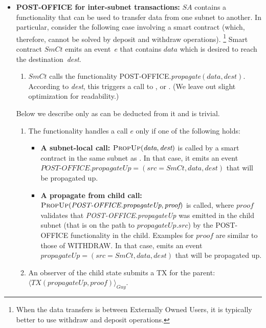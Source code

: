\begin{itemize}
    \item \textbf{POST-OFFICE for inter-subnet transactions:} $SA$ contains a functionality that can be used to transfer data from one subnet to another. In particular, consider the following case involving a smart contract (which, therefore, cannot be solved by deposit and withdraw operations).%
    \footnote{When the data transfers is between Externally Owned Users, it is typically better to use withdraw and deposit operations.}
    Smart contract $\textit{SmCt}$ emits an event~$e$ that contains $\textit{data}$ which is desired to reach the destination~\textit{dest}.
    \begin{enumerate}
        \item $\textit{SmCt}$ calls the functionality POST-OFFICE.\textit{propagate}$(\textit{data}, \textit{dest})$. According to \textit{dest}, this triggers a call to \pUp{}, \pDn{} or \pHr. (We leave out slight optimization for readability.)
        \setcounter{myCounter}{\value{enumi}}
    \end{enumerate}
    Below we describe only \pUp{} as \pDn{} can be deducted from it and \pHr{} is trivial.
    \begin{enumerate}
        \setcounter{enumi}{\value{myCounter}}
        \item The functionality \pUp{} handles a call $e$ only if one of the following holds:
        \begin{itemize}
            \item \textbf{A subnet-local call:} $\textsc{PropUp}(\textit{data}, \textit{dest})$ is called by a smart contract in the same subnet as \pUp. In that case, it emits an event $\textit{POST-OFFICE.propagateUp}=(\textit{src}=\textit{SmCt}, \textit{data}, \textit{dest})$ that will be propagated up.
            \item \textbf{A propagate from child call:} $\textsc{PropUp}(\textit{POST-OFFICE.propagateUp}, \textit{proof})$ is called, where $\textit{proof}$ validates that \textit{POST-OFFICE.propagateUp} was emitted in the child subnet (that is on the path to $\textit{propagateUp}.\textit{src}$) by the POST-OFFICE functionality in the child.
            Examples for $\textit{proof}$ are similar to those of WITHDRAW.
            In that case, \pUp{} emits an event $\textit{propagateUp}=(\textit{src}=\textit{SmCt}, \textit{data}, \textit{dest})$ that will be propagated up.
        \end{itemize}
        \item\label{step:obs} An observer of the child state submits a TX for the parent:  $\langle TX(\textit{propagateUp}, \textit{proof})\rangle_{Guy}$.

\end{enumerate}
\end{itemize}
